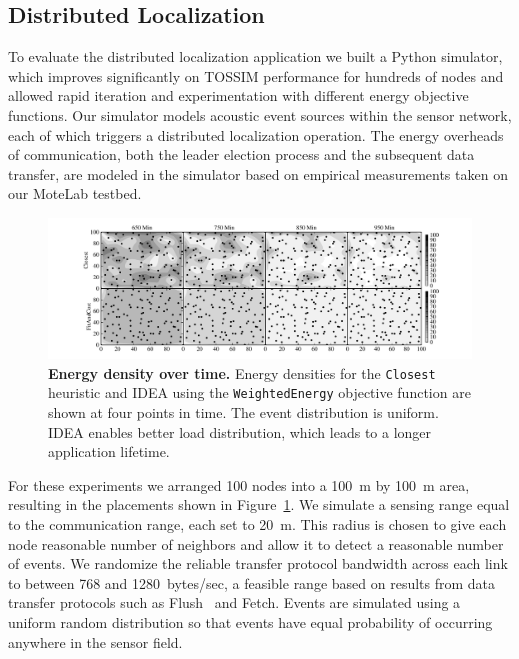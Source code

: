 \subsection{Distributed Localization}

To evaluate the distributed localization application we built a Python
simulator, which improves significantly on TOSSIM performance for hundreds of
nodes and allowed rapid iteration and experimentation with different energy
objective functions. Our simulator models acoustic event sources within the
sensor network, each of which triggers a distributed localization operation.
The energy overheads of communication, both the leader election process and
the subsequent data transfer, are modeled in the simulator based on empirical
measurements taken on our MoteLab testbed.

\begin{figure}[t]
\begin{center}
\includegraphics[width=\hsize]{./5-idea/figs/localizationdensityvtime.pdf}
\end{center}

\caption{\textbf{Energy density over time.} Energy densities for the
\texttt{Closest} heuristic and IDEA using the \texttt{WeightedEnergy}
objective function are shown at four points in time. The event distribution
is uniform. IDEA enables better load distribution, which leads to a longer
application lifetime.}

\label{idea-fig-localizationdensityvtime}
\end{figure}

For these experiments we arranged 100 nodes into a 100~m by 100~m area,
resulting in the placements shown in
Figure~\ref{idea-fig-localizationdensityvtime}. We simulate a sensing range
equal to the communication range, each set to 20~m. This radius is chosen to
give each node reasonable number of neighbors and allow it to detect a
reasonable number of events. We randomize the reliable transfer protocol
bandwidth across each link to between 768 and 1280~bytes/sec, a feasible
range based on results from data transfer protocols such as
Flush~\cite{flush-sensys07} and Fetch. Events are simulated using a uniform
random distribution so that events have equal probability of occurring
anywhere in the sensor field.

